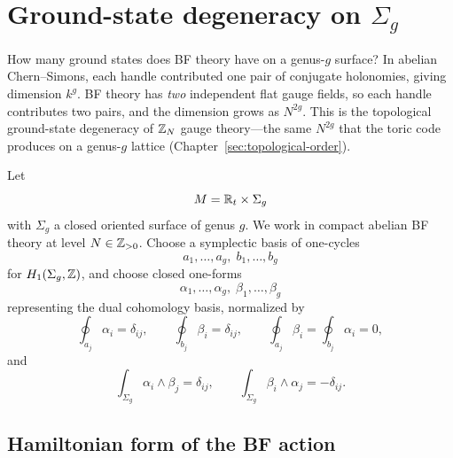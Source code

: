\section{Ground-state degeneracy on \texorpdfstring{$\Sigma_g$}{Sigma\_g}}\label{sec:bf-gsd}

How many ground states does BF theory have on a genus-$g$ surface?  In abelian Chern--Simons, each handle contributed one pair of conjugate holonomies, giving dimension $k^g$.  BF theory has \emph{two} independent flat gauge fields, so each handle contributes two pairs, and the dimension grows as $N^{2g}$.  This is the topological ground-state degeneracy of $\mathbb{Z}_N$ gauge theory---the same $N^{2g}$ that the toric code produces on a genus-$g$ lattice (Chapter~\ref{sec:topological-order}).

\begin{assumption}\label{ass:bf-gsd}
Let
\begin{equation*}
M=\mathbb{R}_t\times \Sigma_g
\end{equation*}
with $\Sigma_g$ a closed oriented surface of genus $g$. We work in compact abelian BF theory at level $N\in \mathbb{Z}_{>0}$. Choose a symplectic basis of one-cycles
\begin{equation*}
a_1,\dots,a_g,\; b_1,\dots,b_g
\end{equation*}
for $H_1(\Sigma_g,\mathbb{Z})$, and choose closed one-forms
\begin{equation*}
\alpha_1,\dots,\alpha_g,\; \beta_1,\dots,\beta_g
\end{equation*}
representing the dual cohomology basis, normalized by
\begin{equation}\label{eq:bf-basis-periods}
\oint_{a_j}\alpha_i=\delta_{ij},
\qquad
\oint_{b_j}\beta_i=\delta_{ij},
\qquad
\oint_{a_j}\beta_i=\oint_{b_j}\alpha_i=0,
\end{equation}
and
\begin{equation}\label{eq:bf-basis-pairing}
\int_{\Sigma_g}\alpha_i\wedge \beta_j=\delta_{ij},
\qquad
\int_{\Sigma_g}\beta_i\wedge \alpha_j=-\delta_{ij}.
\end{equation}
\end{assumption}

\subsection{Hamiltonian form of the BF action}


